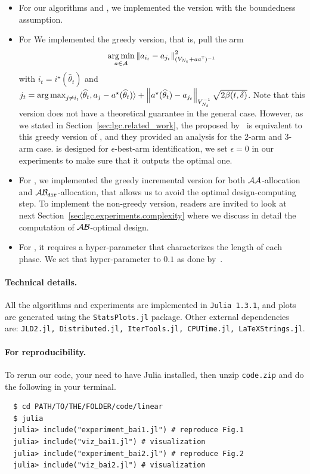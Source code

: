 \begin{itemize}
	\item For our algorithms \LG and \LGC, we implemented the version with the boundedness assumption.
	\item For \LGapE We implemented the greedy version, that is, pull the arm 
	\[
	    \operatorname*{arg\,min}_{a\in\mathcal{A}} \left\lVert a_{i_t}-a_{j_t}\right\rVert_{(V_{N_t}+aa^{\mathsf{\scriptscriptstyle T}})^{-1}}^2
	\]
	with $i_t = i^\star(\hat\theta_t)$ and $j_t = \operatorname*{arg\,max}_{j\neq i_t}\langle\widehat\theta_t,a_{j}-a^\star(\widehat\theta_t)\rangle + \left\lVert a^\star(\widehat\theta_t) - a_{j_t}\right\rVert_{V_{N_t}^{-1}} \sqrt{2\beta(t,\delta)}$. Note that this version does not have a theoretical guarantee in the general case. However, as we stated in Section~\ref{sec:lgc.related_work}, the \GLUCB proposed by~\citet{zaki2019maxoverlap} is equivalent to this greedy version of \LGapE, and they provided an analysis for the 2-arm and 3-arm case. \LGapE is designed for $\epsilon$-best-arm identification, we set $\epsilon=0$ in our experiments to make sure that it outputs the optimal one.
	\item For \XYS, we implemented the greedy incremental version for both $\mathcal{A}\mathcal{A}$-allocation and $\mathcal{A}\mathcal{B}_{\texttt{dir}}$-allocation, that allows us to avoid the optimal design-computing step. To implement the non-greedy version, readers are invited to look at next Section~\ref{sec:lgc.experiments.complexity} where we discuss in detail the computation of $\mathcal{A}\mathcal{B}$-optimal design.
	\item For \XYA, it requires a hyper-parameter that characterizes the length of each phase. We set that hyper-parameter to $0.1$ as done by~\citet{soare2014linear}.
\end{itemize}

\paragraph{Technical details.} All the algorithms and experiments are implemented in \lstinline{Julia 1.3.1}, and plots are generated using the \lstinline{StatsPlots.jl} package. Other external dependencies are: \lstinline{JLD2.jl, Distributed.jl, IterTools.jl, CPUTime.jl, LaTeXStrings.jl}.

\paragraph{For reproducibility.} To rerun our code, your need to have Julia installed, then unzip \lstinline{code.zip} and do the following in your terminal.

\begin{lstlisting}
  $ cd PATH/TO/THE/FOLDER/code/linear
  $ julia
  julia> include("experiment_bai1.jl") # reproduce Fig.1
  julia> include("viz_bai1.jl") # visualization
  julia> include("experiment_bai2.jl") # reproduce Fig.2
  julia> include("viz_bai2.jl") # visualization
\end{lstlisting}

